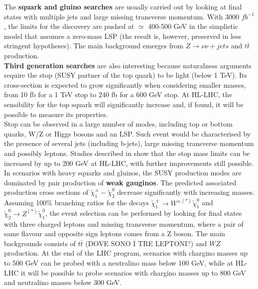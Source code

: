 \documentclass[a4paper,twoside,12pt]{article}
\begin{document}
The \textbf{squark and gluino searches} are usually carried out by looking at final states
with multiple jets and large missing transverse momentum. With 3000 $fb^{-1}$, the limits for the discovery are pushed at $\simeq$ 400-500 GeV\cite{loi} in the 
simplistic model that assumes a zero-mass LSP (the result is, however, preserved in less
stringent hypotheses). The main background emerges from $Z \rightarrow \nu\nu + jets$ and 
$t\bar{t}$ production.\\

\textbf{Third generation searches} are also interesting because naturalness arguments require
the stop (SUSY partner of the top quark) to be light (below 1 TeV). Its cross-section is expected to grow significantly when 
considering smaller masses, from 10 fb for a 1 TeV stop to 240 fb for a 600 GeV stop. At
HL-LHC, the sensibility for the top squark will significantly increase and, if found, it will be possible to measure its properties. \\

Stop can be observed in a large number of modes,
including top or bottom
quarks, W/Z or Higgs bosons and an LSP. Such event would be characterised by the presence
of several jets (including b-jets), large missing transverse momentum and possibly leptons. 
Studies described in \cite{loi} show that the stop mass limits can be increased by up to
200 GeV at HL-LHC, with further improvements still possible.\\

In scenarios with heavy squarks and gluinos, the SUSY production modes are dominated by 
pair production of \textbf{weak gauginos}. The predicted associated production cross sections of $\widetilde{\chi}_1^\pm - \widetilde{\chi}_2^0$  decrease significantly
with increasing masses. Assuming 100\% branching ratios for the decays
$\widetilde{\chi}_1^\pm \rightarrow W^{\pm(*)} \widetilde{\chi}_1^0$ and 
$\widetilde{\chi}_2^0 \rightarrow Z^{(*)}\widetilde{\chi}_1^0$, the event selection can be
performed by looking for final states with three charged leptons and missing transverse momentum,
where a pair of same flavour and opposite sign leptons comes from a Z boson. The main
backgrounds consists of $t\bar{t}$ (DOVE SONO I TRE LEPTONI?) and $WZ$ production.
At the end of the LHC program, scenarios with chargino masses up to 500 GeV can be probed
with a neutralino mass below 100 GeV, while at HL-LHC it will be possible to probe scenarios
with chargino masses up to 800 GeV and neutralino masses below 300 GeV.
\end{document}
